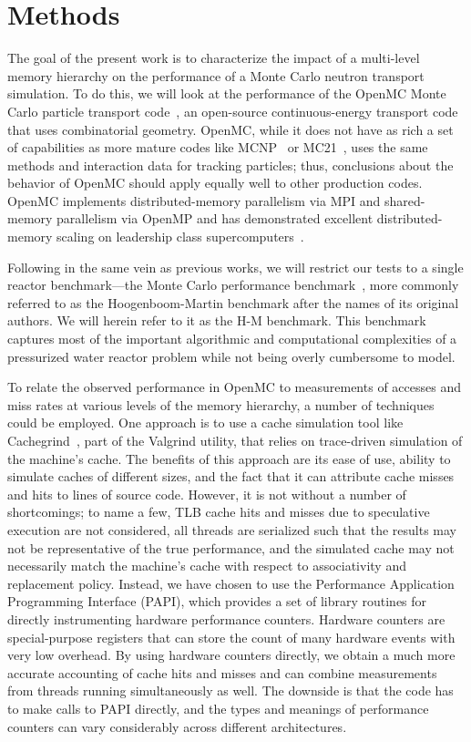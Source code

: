 \documentclass{mc2015}
\begin{document}
\section{Methods}

The goal of the present work is to characterize the impact of a multi-level
memory hierarchy on the performance of a Monte Carlo neutron transport
simulation. To do this, we will look at the performance of the OpenMC Monte
Carlo particle transport code~\cite{ane-romano-2013, ane-romano-2014}, an
open-source continuous-energy transport code that uses combinatorial
geometry. OpenMC, while it does not have as rich a set of capabilities as more
mature codes like MCNP~\cite{lanl-goorley-2014} or
MC21~\cite{ane-griesheimer-2014}, uses the same methods and interaction data
for tracking particles; thus, conclusions about the behavior of OpenMC should
apply equally well to other production codes. OpenMC implements
distributed-memory parallelism via MPI and shared-memory parallelism via OpenMP
and has demonstrated excellent distributed-memory scaling on leadership class
supercomputers~\cite{ane-romano-2013}.

Following in the same vein as previous works, we will restrict our tests to a
single reactor benchmark---the Monte Carlo performance
benchmark~\cite{mc-hoogenboom-2011}, more commonly referred to as the
Hoogenboom-Martin benchmark after the names of its original authors. We will
herein refer to it as the H-M benchmark. This benchmark captures most of the
important algorithmic and computational complexities of a pressurized water
reactor problem while not being overly cumbersome to model.

To relate the observed performance in OpenMC to measurements of accesses and
miss rates at various levels of the memory hierarchy, a number of techniques
could be employed. One approach is to use a cache simulation tool like
Cachegrind~\cite{cachegrind}, part of the Valgrind utility, that relies on
trace-driven simulation of the machine's cache. The benefits of this approach
are its ease of use, ability to simulate caches of different sizes, and the
fact that it can attribute cache misses and hits to lines of source
code. However, it is not without a number of shortcomings; to name a few, TLB
cache hits and misses due to speculative execution are not considered, all
threads are serialized such that the results may not be representative of the
true performance, and the simulated cache may not necessarily match the
machine's cache with respect to associativity and replacement policy. Instead,
we have chosen to use the Performance Application Programming Interface (PAPI),
which provides a set of library routines for directly instrumenting hardware
performance counters. Hardware counters are special-purpose registers that can
store the count of many hardware events with very low overhead. By using
hardware counters directly, we obtain a much more accurate accounting of cache
hits and misses and can combine measurements from threads running
simultaneously as well. The downside is that the code has to make calls to PAPI
directly, and the types and meanings of performance counters can vary
considerably across different architectures.
\end{document}
